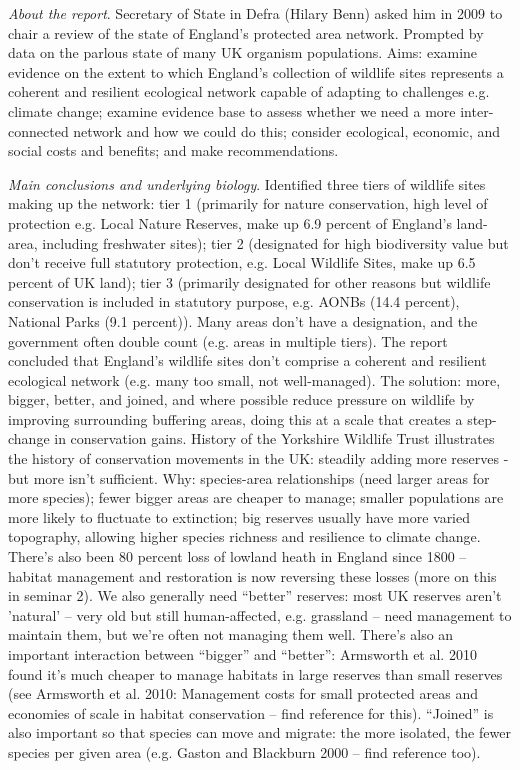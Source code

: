 \documentclass[9pt]{article}
\begin{document}
	\textit{About the report}. Secretary of State in Defra (Hilary Benn) asked him in 2009 to chair a review of the state of England’s protected area network. Prompted by data on the parlous state of many UK organism populations. Aims: examine evidence on the extent to which England’s collection of wildlife sites represents a coherent and resilient ecological network capable of adapting to challenges e.g. climate change; examine evidence base to assess whether we need a more inter-connected network and how we could do this; consider ecological, economic, and social costs and benefits; and make recommendations. 
	
	\textit{Main conclusions and underlying biology}. Identified three tiers of wildlife sites making up the network: tier 1 (primarily for nature conservation, high level of protection e.g. Local Nature Reserves, make up 6.9 percent of England’s land-area, including freshwater sites); tier 2 (designated for high biodiversity value but don’t receive full statutory protection, e.g. Local Wildlife Sites, make up 6.5 percent of UK land); tier 3 (primarily designated for other reasons but wildlife conservation is included in statutory purpose, e.g. AONBs (14.4 percent), National Parks (9.1 percent)). Many areas don’t have a designation, and the government often double count (e.g. areas in multiple tiers). The report concluded that England’s wildlife sites don’t comprise a coherent and resilient ecological network (e.g. many too small, not well-managed). The solution: more, bigger, better, and joined, and where possible reduce pressure on wildlife by improving surrounding buffering areas, doing this at a scale that creates a step-change in conservation gains. History of the Yorkshire Wildlife Trust illustrates the history of conservation movements in the UK: steadily adding more reserves - but more isn't sufficient. Why: species-area relationships (need larger areas for more species); fewer bigger areas are cheaper to manage; smaller populations are more likely to fluctuate to extinction; big reserves usually have more varied topography, allowing higher species richness and resilience to climate change. There's also been 80 percent loss of lowland heath in England since 1800 – habitat management and restoration is now reversing these losses (more on this in seminar 2). We also generally need “better” reserves: most UK reserves aren't 'natural' – very old but still human-affected, e.g. grassland – need management to maintain them, but we're often not managing them well. There’s also an important interaction between “bigger” and “better”: Armsworth et al. 2010 found it’s much cheaper to manage habitats in large reserves than small reserves (see Armsworth et al. 2010: Management costs for small protected areas and economies of scale in habitat conservation – find reference for this). “Joined” is also important so that species can move and migrate: the more isolated, the fewer species per given area (e.g. Gaston and Blackburn 2000 – find reference too).  
	
\end{document}
